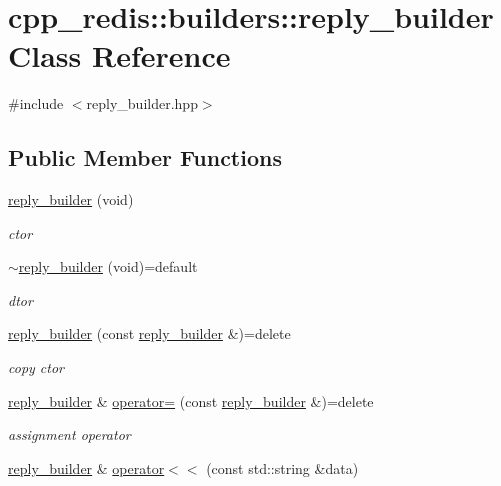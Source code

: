 \hypertarget{classcpp__redis_1_1builders_1_1reply__builder}{}\section{cpp\+\_\+redis\+:\+:builders\+:\+:reply\+\_\+builder Class Reference}
\label{classcpp__redis_1_1builders_1_1reply__builder}


{\ttfamily \#include $<$reply\+\_\+builder.\+hpp$>$}

\subsection*{Public Member Functions}
\begin{DoxyCompactItemize}
\item 
\hyperlink{classcpp__redis_1_1builders_1_1reply__builder_accbe07b853ad26338abf18f7975f616f}{reply\+\_\+builder} (void)
\begin{DoxyCompactList}\small\item\em ctor \end{DoxyCompactList}\item 
\hyperlink{classcpp__redis_1_1builders_1_1reply__builder_ac2df7e1ed2f67e01090ad45926c9af1e}{$\sim$reply\+\_\+builder} (void)=default
\begin{DoxyCompactList}\small\item\em dtor \end{DoxyCompactList}\item 
\hyperlink{classcpp__redis_1_1builders_1_1reply__builder_acfffbe0b66c7f9da0f1772b2b7fbdc17}{reply\+\_\+builder} (const \hyperlink{classcpp__redis_1_1builders_1_1reply__builder}{reply\+\_\+builder} \&)=delete
\begin{DoxyCompactList}\small\item\em copy ctor \end{DoxyCompactList}\item 
\hyperlink{classcpp__redis_1_1builders_1_1reply__builder}{reply\+\_\+builder} \& \hyperlink{classcpp__redis_1_1builders_1_1reply__builder_a445ca388e241fe95b522890fee8c14ca}{operator=} (const \hyperlink{classcpp__redis_1_1builders_1_1reply__builder}{reply\+\_\+builder} \&)=delete
\begin{DoxyCompactList}\small\item\em assignment operator \end{DoxyCompactList}\item 
\hyperlink{classcpp__redis_1_1builders_1_1reply__builder}{reply\+\_\+builder} \& \hyperlink{classcpp__redis_1_1builders_1_1reply__builder_a5f675e309a7a6002d582293c6410c967}{operator$<$$<$} (const std\+::string \&data)

\end{DoxyCompactItemize}
